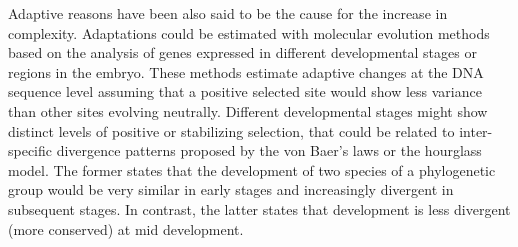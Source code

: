 \hfill\break 
Adaptive reasons have been also said to be the cause for the increase in complexity.
%
%
%
Adaptations could be estimated with molecular evolution methods based on the analysis of genes expressed in different developmental stages or regions in the embryo. 
These methods estimate adaptive changes at the DNA sequence level assuming that
a positive selected site would show less variance than other sites evolving neutrally.
%
%
Different developmental stages might show distinct levels of positive or stabilizing selection, 
that could be related to inter-specific divergence patterns proposed by the von Baer's laws or the hourglass model. 
The former states that the development of two species of a phylogenetic group would be very similar in early stages and increasingly divergent in subsequent stages. In contrast, the latter states that development is less divergent (more conserved) at mid development.

